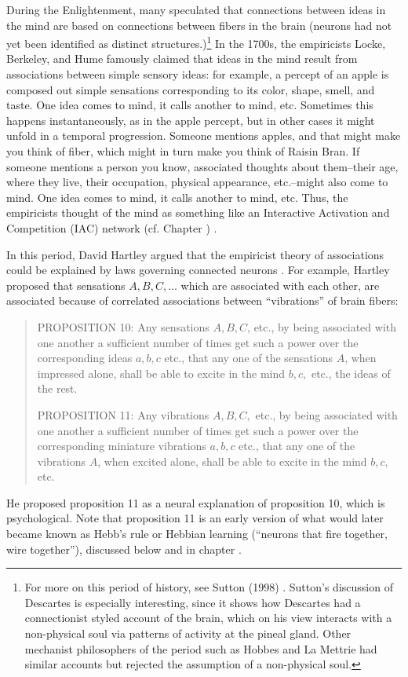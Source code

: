 During the Enlightenment, many speculated that connections between ideas in the mind are based on connections between fibers in the brain (neurons had not yet been identified as distinct structures.)\footnote{For more on this period of history, see Sutton (1998) \cite{sutton1998philosophy}. Sutton's discussion of Descartes is especially interesting, since it shows how Descartes had a connectionist styled account of the brain, which on his view  interacts with a non-physical soul via patterns of activity at the pineal gland. Other mechanist philosophers of the period such as Hobbes and La Mettrie had similar accounts but rejected the assumption of a non-physical soul.} In the 1700s, the empiricists Locke, Berkeley, and Hume famously claimed that ideas in the mind result from associations between simple sensory ideas: for example, a percept of an apple is composed out simple sensations corresponding to its color, shape, smell, and taste. One idea comes to mind, it calls another to mind, etc. Sometimes this happens instantaneously, as in the apple percept, but in other cases it might unfold in a temporal progression. Someone mentions apples, and that might make you think of fiber, which might in turn make you think of Raisin Bran. If someone mentions a person you know, associated thoughts about them--their age, where they live, their occupation, physical appearance, etc.--might also come to mind. One idea comes to mind, it calls another to mind, etc. Thus, the empiricists thought of the mind as something like an Interactive Activation and Competition (IAC) network (cf. Chapter ) \cite{bain1873mind}.

In this period, David Hartley argued that the empiricist theory of associations could be explained by laws governing connected neurons \cite{hartley1834observations, bain1873mind}. For example, Hartley \cite{hartley1749observations} proposed that sensations $A,B,C,...$ which are associated with each other, are associated because of correlated associations between ``vibrations'' of brain fibers:
\begin{quotation}
PROPOSITION 10: Any sensations $A, B, C$, etc., by being associated with one another a sufficient number of times get such a  power over the corresponding ideas $a, b, c$ etc., that any one of the sensations $A$, when impressed alone, shall be able to excite in the mind $b, c,$ etc., the ideas of the rest.

PROPOSITION 11: Any vibrations $A, B, C,$ etc., by being associated with one another a sufficient number of times get such a  power over the corresponding miniature vibrations $a, b, c$ etc., that any one of the vibrations $A$, when excited alone, shall be able to excite in the mind $b, c$, etc. 
\end{quotation}
He proposed proposition 11 as a neural explanation of proposition 10, which is psychological. Note that proposition 11 is an early version of what would later became known as Hebb's rule or Hebbian learning (``neurons that fire together, wire together''), discussed below and in chapter .

